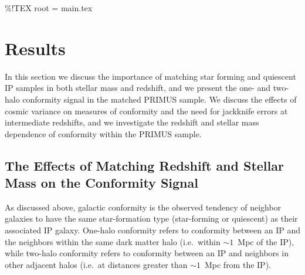 \%!TEX root = main.tex

\section{Results}\label{sec:results}

In this section we discuss the importance of matching star forming and quiescent IP 
samples in both stellar mass and redshift, and we present the one- and two-halo 
conformity signal in the matched PRIMUS sample.  We discuss the effects of 
cosmic variance on measures of conformity and the need for jackknife
errors at intermediate redshifts, and we investigate the redshift and stellar mass 
dependence of conformity within the PRIMUS sample.

\subsection{The Effects of Matching Redshift and Stellar Mass on the Conformity Signal}\label{sec:LTfraction}

As discussed above, galactic conformity is the observed tendency of neighbor 
galaxies to have the same star-formation type (star-forming or quiescent) 
as their associated IP galaxy.
One-halo conformity refers to conformity between an IP and the neighbors within the 
same dark matter halo (i.e.~within $\sim1$~Mpc of the IP),
while two-halo conformity refers to conformity between an IP and neighbors in other 
adjacent halos (i.e.~at distances greater than $\sim1$~Mpc from the IP).

